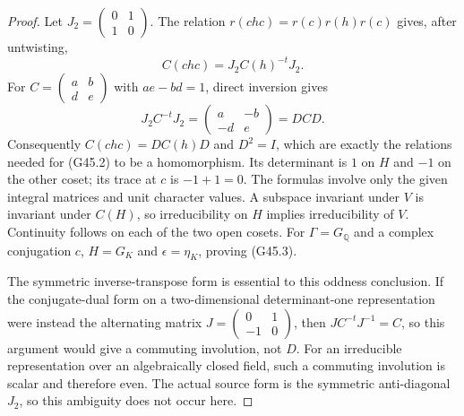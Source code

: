\begin{proof}
Let $J_2=\left(\begin{smallmatrix}0&1\\1&0\end{smallmatrix}\right)$.
The relation $r(chc)=r(c)r(h)r(c)$ gives, after untwisting,
\[
 C(chc)=J_2C(h)^{-t}J_2.
\]
For $C=\left(\begin{smallmatrix}a&b\\d&e\end{smallmatrix}\right)$
with $ae-bd=1$, direct inversion gives
\[
       J_2C^{-t}J_2=
       \begin{pmatrix}a&-b\\-d&e\end{pmatrix}=DCD.
\]
Consequently $C(chc)=DC(h)D$ and $D^2=I$, which are exactly
the relations needed for (G45.2) to be a homomorphism.
Its determinant is $1$ on $H$ and $-1$ on the other coset;
its trace at $c$ is $-1+1=0$.
The formulas involve only the given integral matrices and unit
character values.  A subspace invariant under $V$ is invariant
under $C(H)$, so irreducibility on $H$ implies irreducibility
of $V$.  Continuity follows on each of the two open cosets.
For $\Gamma=G_{\mathbb Q}$ and a complex conjugation $c$,
$H=G_K$ and $\epsilon=\eta_K$, proving (G45.3).

The symmetric inverse-transpose form is essential to this oddness
conclusion.  If the conjugate-dual form on a two-dimensional
determinant-one representation were instead the alternating matrix
$J=\left(\begin{smallmatrix}0&1\\-1&0\end{smallmatrix}\right)$,
then $J C^{-t}J^{-1}=C$, so this argument would give a commuting
involution, not $D$.  For an irreducible representation over an
algebraically closed field, such a commuting involution is scalar
and therefore even.  The actual source form is the symmetric
anti-diagonal $J_2$, so this ambiguity does not occur here.
\end{proof}

